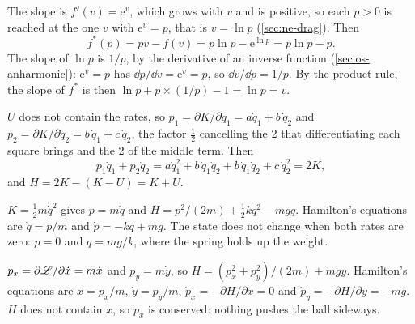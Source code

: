 \label{sec:ha-solutions}

The slope is $f'(v) = \mathrm{e}^v$, which grows
with $v$ and is positive, so each $p > 0$ is reached at the one $v$ with
$\mathrm{e}^v = p$, that is $v = \ln p$ (\cref{sec:ne-drag}). Then
\begin{equation*}
   f^*(p) = pv - f(v) = p\ln p - \mathrm{e}^{\ln p} = p\ln p - p .
\end{equation*}
The slope of $\ln p$ is $1/p$, by the derivative of an inverse function
(\cref{sec:os-anharmonic}): $\mathrm{e}^v = p$ has $\dd p/\dd v =
\mathrm{e}^v = p$, so $\dd v/\dd p = 1/p$. By the product rule, the slope
of $f^*$ is then $\ln p + p\times(1/p) - 1 = \ln p = v$.

$U$ does not contain the rates, so $p_1 =
\partial K/\partial\dot{q}_1 = a\dot{q}_1 + b\,\dot{q}_2$ and $p_2 =
\partial K/\partial\dot{q}_2 = b\,\dot{q}_1 + c\,\dot{q}_2$, the factor
$\frac12$ cancelling the 2 that differentiating each square brings and
the 2 of the middle term. Then
\begin{equation*}
   p_1\dot{q}_1 + p_2\dot{q}_2 = a\dot{q}_1^2 + b\,\dot{q}_1\dot{q}_2
   + b\,\dot{q}_1\dot{q}_2 + c\,\dot{q}_2^2 = 2K ,
\end{equation*}
and $H = 2K - (K - U) = K + U$.

$K = \frac12 m\dot{q}^2$ gives $p = m\dot{q}$
and $H = p^2/(2m) + \frac12 kq^2 - mgq$. Hamilton's equations are $\dot{q}
= p/m$ and $\dot{p} = -kq + mg$. The state does not change when both
rates are zero: $p = 0$ and $q = mg/k$, where the spring holds up the
weight.

$p_x = \partial\mathscr{L}/\partial\dot{x} = m\dot{x}$
and $p_y = m\dot{y}$, so $H = (p_x^2 + p_y^2)/(2m) + mgy$. Hamilton's
equations are $\dot{x} = p_x/m$, $\dot{y} = p_y/m$, $\dot{p}_x =
-\partial H/\partial x = 0$ and $\dot{p}_y = -\partial H/\partial y =
-mg$. $H$ does not contain $x$, so $p_x$ is conserved: nothing pushes the
ball sideways.

